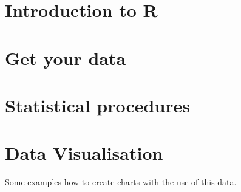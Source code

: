 \documentclass{tufte-book}
\begin{document}
\chapter{Introduction to R}
\label{sec:introToR}



\chapter{Get your data}



\chapter{Statistical procedures}


\chapter{Data Visualisation}

Some examples how to create charts with the use of this data. 

\backmatter





\printindex
\end{document}
